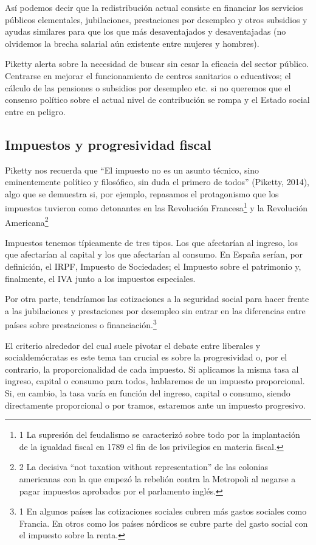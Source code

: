 \documentclass[
]{article}
\begin{document}
Así podemos decir que la redistribución actual consiste en financiar los
servicios públicos elementales, jubilaciones, prestaciones por desempleo
y otros subsidios y ayudas similares para que los que más desaventajados
y desaventajadas (no olvidemos la brecha salarial aún existente entre
mujeres y hombres).

Piketty alerta sobre la necesidad de buscar sin cesar la eficacia del
sector público. Centrarse en mejorar el funcionamiento de centros
sanitarios o educativos; el cálculo de las pensiones o subsidios por
desempleo etc. si no queremos que el consenso político sobre el actual
nivel de contribución se rompa y el Estado social entre en peligro.

\hypertarget{impuestos-y-progresividad-fiscal}{%
\subsection{Impuestos y progresividad
fiscal}\label{impuestos-y-progresividad-fiscal}}

Piketty nos recuerda que ``El impuesto no es un asunto técnico, sino
eminentemente político y filosófico, sin duda el primero de todos''
(Piketty, 2014), algo que se demuestra si, por ejemplo, repasamos el
protagonismo que los impuestos tuvieron como detonantes en las
Revolución Francesa\footnote{1 La supresión del feudalismo se
  caracterizó sobre todo por la implantación de la igualdad fiscal en
  1789 el fin de los privilegios en materia fiscal.} y la Revolución
Americana\footnote{2 La decisiva ``not taxation without representation''
  de las colonias americanas con la que empezó la rebelión contra la
  Metropoli al negarse a pagar impuestos aprobados por el parlamento
  inglés.}

Impuestos tenemos típicamente de tres tipos. Los que afectarían al
ingreso, los que afectarían al capital y los que afectarían al consumo.
En España serían, por definición, el IRPF, Impuesto de Sociedades; el
Impuesto sobre el patrimonio y, finalmente, el IVA junto a los impuestos
especiales.

Por otra parte, tendríamos las cotizaciones a la seguridad social para
hacer frente a las jubilaciones y prestaciones por desempleo sin entrar
en las diferencias entre países sobre prestaciones o
financiación.\footnote{1 En algunos países las cotizaciones sociales
  cubren más gastos sociales como Francia. En otros como los países
  nórdicos se cubre parte del gasto social con el impuesto sobre la
  renta.}

El criterio alrededor del cual suele pivotar el debate entre liberales y
socialdemócratas es este tema tan crucial es sobre la progresividad o,
por el contrario, la proporcionalidad de cada impuesto. Si aplicamos la
misma tasa al ingreso, capital o consumo para todos, hablaremos de un
impuesto proporcional. Si, en cambio, la tasa varía en función del
ingreso, capital o consumo, siendo directamente proporcional o por
tramos, estaremos ante un impuesto progresivo.
\end{document}

